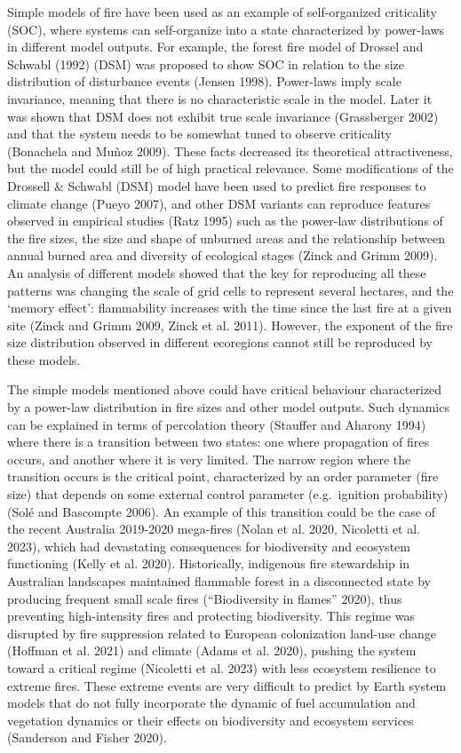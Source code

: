 \documentclass[
]{article}
\begin{document}
Simple models of fire have been used as an example of self-organized
criticality (SOC), where systems can self-organize into a state
characterized by power-laws in different model outputs. For example, the
forest fire model of Drossel and Schwabl (1992) (DSM) was proposed to
show SOC in relation to the size distribution of disturbance events
(Jensen 1998). Power-laws imply scale invariance, meaning that there is
no characteristic scale in the model. Later it was shown that DSM does
not exhibit true scale invariance (Grassberger 2002) and that the system
needs to be somewhat tuned to observe criticality (Bonachela and Muñoz
2009). These facts decreased its theoretical attractiveness, but the
model could still be of high practical relevance. Some modifications of
the Drossell \& Schwabl (DSM) model have been used to predict fire
responses to climate change (Pueyo 2007), and other DSM variants can
reproduce features observed in empirical studies (Ratz 1995) such as the
power-law distributions of the fire sizes, the size and shape of
unburned areas and the relationship between annual burned area and
diversity of ecological stages (Zinck and Grimm 2009). An analysis of
different models showed that the key for reproducing all these patterns
was changing the scale of grid cells to represent several hectares, and
the `memory effect': flammability increases with the time since the last
fire at a given site (Zinck and Grimm 2009, Zinck et al. 2011). However,
the exponent of the fire size distribution observed in different
ecoregions cannot still be reproduced by these models.

The simple models mentioned above could have critical behaviour
characterized by a power-law distribution in fire sizes and other model
outputs. Such dynamics can be explained in terms of percolation theory
(Stauffer and Aharony 1994) where there is a transition between two
states: one where propagation of fires occurs, and another where it is
very limited. The narrow region where the transition occurs is the
critical point, characterized by an order parameter (fire size) that
depends on some external control parameter (e.g.~ignition probability)
(Solé and Bascompte 2006). An example of this transition could be the
case of the recent Australia 2019-2020 mega-fires (Nolan et al. 2020,
Nicoletti et al. 2023), which had devastating consequences for
biodiversity and ecosystem functioning (Kelly et al. 2020).
Historically, indigenous fire stewardship in Australian landscapes
maintained flammable forest in a disconnected state by producing
frequent small scale fires ({``Biodiversity in flames''} 2020), thus
preventing high-intensity fires and protecting biodiversity. This regime
was disrupted by fire suppression related to European colonization
land-use change (Hoffman et al. 2021) and climate (Adams et al. 2020),
pushing the system toward a critical regime (Nicoletti et al. 2023) with
less ecosystem resilience to extreme fires. These extreme events are
very difficult to predict by Earth system models that do not fully
incorporate the dynamic of fuel accumulation and vegetation dynamics or
their effects on biodiversity and ecosystem services (Sanderson and
Fisher 2020).
\end{document}
